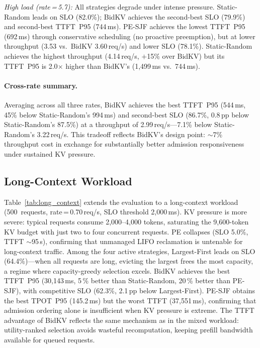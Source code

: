 \documentclass[sigconf,nonacm]{acmart}
\newcommand{\bidkv}{BidKV\xspace}
\begin{document}
\emph{High load (rate\,=\,5.7):}
All strategies degrade under intense pressure.  Static-Random leads on SLO
(82.0\%); \bidkv achieves the second-best SLO (79.9\%) and second-best
TTFT~P95 (744\,ms).  PE-SJF achieves the lowest TTFT~P95 (692\,ms) through
conservative scheduling (no proactive preemption), but at lower throughput
(3.53 vs.\ \bidkv 3.60\,req/s) and lower SLO (78.1\%).
Static-Random achieves the highest throughput (4.14\,req/s, $+$15\% over
\bidkv) but its TTFT~P95 is 2.0$\times$ higher than \bidkv's
(1{,}499\,ms vs.~744\,ms).

\paragraph{Cross-rate summary.}
Averaging across all three rates, \bidkv achieves the best TTFT~P95
(544\,ms, 45\% below Static-Random's 994\,ms) and second-best SLO (86.7\%,
0.8\,pp below Static-Random's 87.5\%) at a throughput of
2.99\,req/s---7.1\% below Static-Random's 3.22\,req/s.  This tradeoff
reflects \bidkv's design point: ${\sim}$7\% throughput cost in exchange for
substantially better admission responsiveness under sustained KV pressure.

\subsection{Long-Context Workload}\label{sec:eval:long}



Table~\ref{tab:long_context} extends the evaluation to a long-context workload
(500~requests, rate\,=\,0.70\,req/s, SLO threshold 2{,}000\,ms).
KV pressure is more severe: typical requests consume 2{,}000--4{,}000
tokens, saturating the 9{,}600-token KV budget with just two to four
concurrent requests.
PE collapses (SLO 5.0\%, TTFT ${\sim}$95\,s), confirming that
unmanaged LIFO reclamation is untenable for long-context traffic.
Among the four active strategies, Largest-First leads on SLO
(64.4\%)---when all requests are long, evicting the largest frees
the most capacity, a regime where capacity-greedy selection excels.
\bidkv achieves the best TTFT~P95 (30{,}143\,ms, 5\,\% better than
Static-Random, 20\,\% better than PE-SJF), with competitive SLO
(62.3\%, 2.1\,pp below Largest-First).
PE-SJF obtains the best TPOT~P95 (145.2\,ms) but the worst TTFT
(37{,}551\,ms), confirming that admission ordering alone is
insufficient when KV pressure is extreme.
The TTFT advantage of \bidkv reflects the same mechanism as in the
mixed workload: utility-ranked selection avoids wasteful recomputation,
keeping prefill bandwidth available for queued requests.
\end{document}
